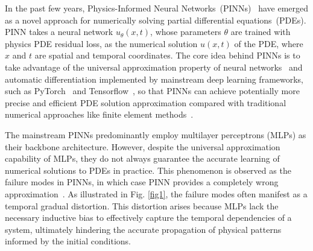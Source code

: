 \documentclass{article}
\theoremstyle{plain}
\theoremstyle{definition}
\theoremstyle{remark}
\begin{document}
In the past few years, Physics-Informed Neural Networks~(PINNs)~\cite{raissi2019physics} have emerged as a novel approach for numerically solving partial differential equations~(PDEs). 
    PINN takes a neural network $u_{\theta}(x,t)$, whose parameters $\theta$ are trained with physics PDE residual loss, as the numerical solution $u(x,t)$ of the PDE, where $x$ and $t$ are spatial and temporal coordinates. 
        The core idea behind PINNs is to take advantage of the universal approximation property of neural networks~\cite{hornik1989multilayer} and automatic differentiation implemented by mainstream deep learning frameworks, such as PyTorch~\cite{paszke2019pytorch} and Tensorflow~\cite{abadi2016tensorflow}, 
            so that PINNs can achieve potentially more precise and efficient PDE solution approximation compared with traditional numerical approaches like finite element methods~\cite{reddy1993introduction}.




The mainstream PINNs predominantly employ multilayer perceptrons (MLPs) as their backbone architecture. However, despite the universal approximation capability of MLPs, they do not always guarantee the accurate learning of numerical solutions to PDEs in practice. This phenomenon is observed as the failure modes in PINNs, in which case PINN provides a completely wrong approximation~\cite{krishnapriyan2021characterizing}. As illustrated in Fig. \ref{fig1}, the failure modes often manifest as a temporal gradual distortion. This distortion arises because MLPs lack the necessary inductive bias to effectively capture the temporal dependencies of a system, ultimately hindering the accurate propagation of physical patterns informed by the initial conditions.
\end{document}
